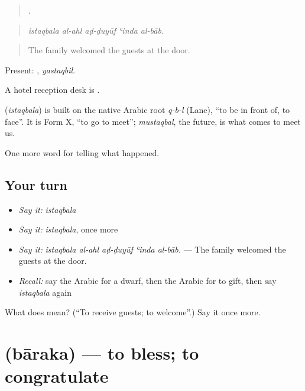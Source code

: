 \begin{quote}
    .
\end{quote}

\begin{quote}
\emph{istaqbala al-ahl aḍ-ḍuyūf ʿinda al-bāb.}
\end{quote}

\begin{quote}
The family welcomed the guests at the door.
\end{quote}

Present: , \emph{yastaqbil}.

A hotel reception desk is .

\begin{cousinweb}
\textbf{} (\emph{istaqbala}) is built on the native Arabic root \emph{q-b-l} (Lane), \textquotedblleft{}to be in front of, to face\textquotedblright{}. It is Form X, \textquotedblleft{}to go to meet\textquotedblright{}; \emph{mustaqbal}, the future, is what comes to meet us.
\end{cousinweb}

\begin{grammarlens}[title={What you've built}]
One more word for telling what happened.
\end{grammarlens}

\subsection*{Your turn}
\begin{itemize}
\raggedright
  \item \emph{Say it:} \emph{istaqbala}
  \item \emph{Say it:} \emph{istaqbala}, once more
  \item \emph{Say it:} \emph{istaqbala al-ahl aḍ-ḍuyūf ʿinda al-bāb.} — The family welcomed the guests at the door.
  \item \emph{Recall:} say the Arabic for a dwarf, then the Arabic for to gift, then say \emph{istaqbala} again
\end{itemize}

\begin{tcolorbox}[breakable,colback=teal!4,colframe=teal!35!black,title={Before you move on}]
What does  mean? (\textquotedblleft{}To receive guests; to welcome\textquotedblright{}.) Say it once more.
\end{tcolorbox}
\section[\texorpdfstring{\ar{بارك} (bāraka)}{بارك (bāraka)}]{ (bāraka) — to bless; to congratulate}

